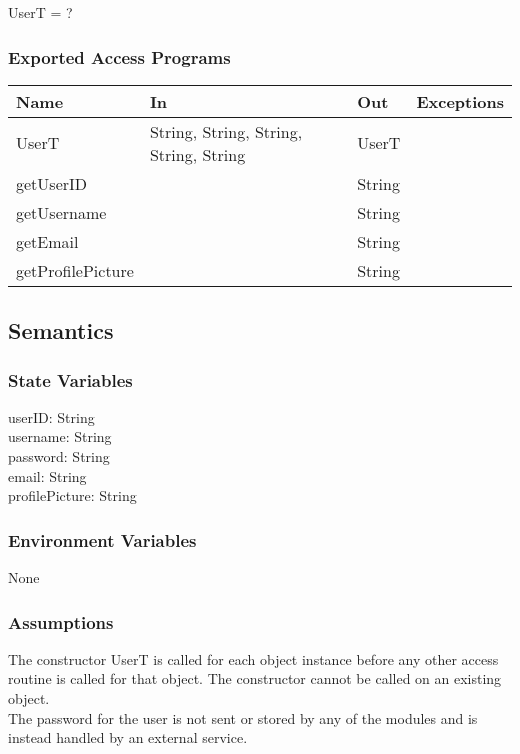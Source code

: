 \documentclass[12pt, titlepage]{article}
\begin{document}
UserT = ?

\subsubsection{Exported Access Programs}
\begin{center}
\begin{tabular}{ |  p{4cm} | p{3cm} |  p{3cm} | p{5cm} | }
\hline
\textbf{Name} & \textbf{In} & \textbf{Out} & \textbf{Exceptions} \\
\hline
UserT & String, String, String, String, String  & UserT & \\
getUserID & & String & \\
getUsername & & String & \\
getEmail & & String & \\
getProfilePicture & & String & \\

\hline
\end{tabular}
\end{center}

\subsection{Semantics}

\subsubsection{State Variables}

userID: String \\
username: String\\
password: String\\
email: String\\
profilePicture: String\\

\subsubsection{Environment Variables}
None

\subsubsection{Assumptions}
The constructor UserT is called for each object instance before any other access routine is called for that object. The constructor cannot be called on an existing object.\\

The password for the user is not sent or stored by any of the modules and is instead handled by an external service.
\end{document}
